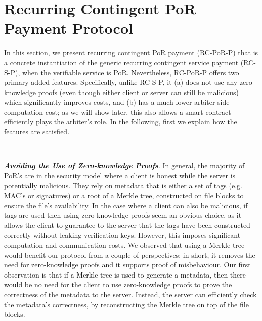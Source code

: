 


\section{Recurring Contingent PoR Payment Protocol}



In this section, we present recurring contingent PoR payment (RC-PoR-P) that is a concrete instantiation of the generic recurring contingent service payment (RC-S-P), when the verifiable service is PoR. Nevertheless, RC-PoR-P offers  two primary added features. Specifically, unlike RC-S-P, it (a) does not use any zero-knowledge proofs (even though either client or server can still be  malicious) which significantly improves  costs, and (b)  has a much lower  arbiter-side computation cost; as we will show later, this also allows a smart contract efficiently plays the arbiter's role. In the following, first we  explain how the features are satisfied.

\

\noindent\textit{\textbf{Avoiding the Use of Zero-knowledge Proofs}}. In general, the majority of  PoR's are in the security model where a client is honest while the server is potentially malicious. They rely on metadata that is either a set of tags (e.g. MAC's or signatures) or a root of a Merkle tree,  constructed on  file blocks to ensure the file's availability. In the case where a client can also  be malicious,  if tags are used then using zero-knowledge proofs seem  an obvious choice, as it allows the client to guarantee to the server that the tags have been constructed correctly without leaking verification keys. However, this imposes significant computation and communication costs. We observed that using a Merkle tree would benefit our protocol from a couple of perspectives; in short, it removes the need for zero-knowledge proofs and it supports proof of misbehaviour. Our first observation is that if a Merkle tree is used to generate a metadata, then   there would be no need for the client to use zero-knowledge proofs to prove the correctness of the metadata to the server. Instead, the server can efficiently check the metadata's correctness, by reconstructing the Merkle tree on top of the file blocks. 

\


